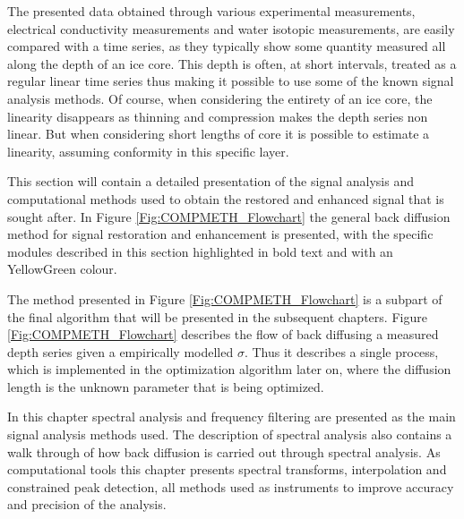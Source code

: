 \documentclass[../../CompleteThesis2/Complete_2ndDraft]{subfiles}
\begin{document}
The presented data obtained through various experimental measurements, electrical conductivity measurements and water isotopic measurements, are easily compared with a time series, as they typically show some quantity measured all along the depth of an ice core. This depth is often, at short intervals, treated as a regular linear time series thus making it possible to use some of the known signal analysis methods. Of course, when considering the entirety of an ice core, the linearity disappears as thinning and compression makes the depth series non linear. But when considering short lengths of core it is possible to estimate a linearity, assuming conformity in this specific layer. 

This section will contain a detailed presentation of the signal analysis and computational methods used to obtain the restored and enhanced signal that is sought after. In Figure \ref{Fig:COMPMETH_Flowchart} the general back diffusion method for signal restoration and enhancement is presented, with the specific modules described in this section highlighted in bold text and with an YellowGreen colour.

The method presented in Figure \ref{Fig:COMPMETH_Flowchart} is a subpart of the final algorithm that will be presented in the subsequent chapters. Figure \ref{Fig:COMPMETH_Flowchart} describes the flow of back diffusing a measured depth series given a empirically modelled $\sigma$. Thus it describes a single process, which is implemented in the optimization algorithm later on, where the diffusion length is the unknown parameter that is being optimized.

In this chapter spectral analysis and frequency filtering are presented as the main signal analysis methods used. The description of spectral analysis also contains a walk through of how back diffusion is carried out through spectral analysis. As computational tools this chapter presents spectral transforms, interpolation and constrained peak detection, all methods used as instruments to improve accuracy and precision of the analysis.
\end{document}
